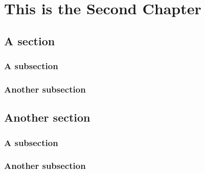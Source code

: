 \documentclass[../ThesisMain]{subfiles}
\begin{document}
\doublespacing%
\chapter{This is the Second Chapter}\label{chap:2}%
\section{A section}
\subsection{A subsection}
\lipsum[0-1]

\subsection{Another subsection}
\lipsum[0-1]

\section{Another section}
\lipsum[0-1]

\subsection{A subsection}
\lipsum[0-1]

\subsection{Another subsection}
\lipsum[0-1]
\end{document}
